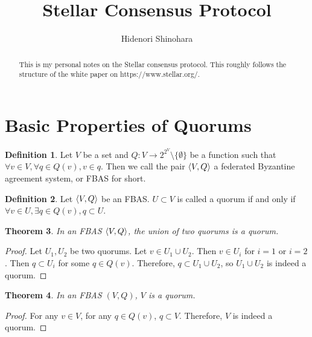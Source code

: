 \documentclass[12pt, psamsfonts]{amsart}
\newtheorem{thm}{Theorem}[section]
\theoremstyle{definition}
\newtheorem{defn}[thm]{Definition}
\theoremstyle{remark}
\numberwithin{equation}{section}
\begin{document}
\title{Stellar Consensus Protocol}
\author{Hidenori Shinohara}
\maketitle

\begin{abstract}
    This is my personal notes on the Stellar consensus protocol.
    This roughly follows the structure of the white paper on https://www.stellar.org/.
\end{abstract}

\tableofcontents


\section{Basic Properties of Quorums}

\begin{defn}
    Let $V$ be a set and $Q:V \rightarrow 2^{2^V} \setminus \{ \emptyset \}$ be a function such that $\forall v \in V, \forall q \in Q(v), v \in q$.
    Then we call the pair $\ev{V, Q}$ a federated Byzantine agreement system, or FBAS for short.
\end{defn}

\begin{defn}
    Let $\ev{V, Q}$ be an FBAS\@.
    $U \subset V$ is called a quorum if and only if $\forall v \in U, \exists q \in Q(v), q \subset U$.
\end{defn}

\begin{thm}\label{union_quorums}
    In an FBAS $\ev{V, Q}$, the union of two quorums is a quorum.
\end{thm}

\begin{proof}
    Let $U_1, U_2$ be two quorums.
    Let $v \in U_1 \cup U_2$.
    Then $v \in U_i$ for $i = 1$ or $i = 2$.
    Then $q \subset U_i$ for some $q \in Q(v)$.
    Therefore, $q \subset U_1 \cup U_2$, so $U_1 \cup U_2$ is indeed a quorum.
\end{proof}

\begin{thm}
    In an FBAS $(V, Q)$, $V$ is a quorum.
\end{thm}

\begin{proof}
    For any $v \in V$, for any $q \in Q(v)$, $q \subset V$.
    Therefore, $V$ is indeed a quorum.
\end{proof}
\end{document}
